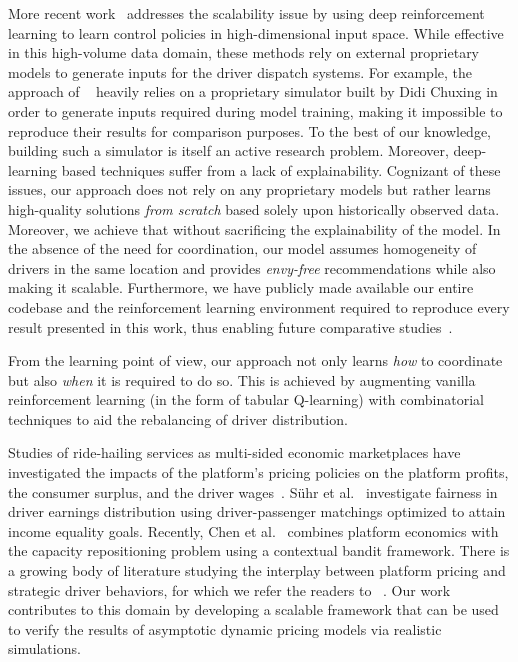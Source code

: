     
More recent work~\cite{Mnih2013-sj,Tang2019-xu,
    Lin2018-vs, Wen2017-vp, Wang2018-bv} 
    addresses the scalability issue by using deep reinforcement learning to learn 
    control policies in high-dimensional input space. 
While effective in this high-volume data domain, these methods rely on
    external proprietary models to generate inputs for the driver dispatch
    systems.
For example, the approach of ~\cite{Lin2018-vs} heavily relies on 
    a proprietary simulator built by Didi Chuxing in order to generate inputs 
    required during model training, making it impossible 
    to reproduce their results for comparison purposes.
To the best of our knowledge, building such a simulator is itself an 
   active research problem.
Moreover, deep-learning based techniques suffer from a lack of
    explainability.
Cognizant of these issues, our approach does not rely on any proprietary models 
    but rather learns high-quality solutions \emph{from scratch} based solely 
    upon historically observed data.
Moreover, we achieve that without sacrificing the explainability of the
    model.
In the absence of the need for coordination, our model assumes homogeneity of 
    drivers in the same location and provides
    \emph{envy-free} recommendations while also making it scalable. 
Furthermore, we have publicly made available our entire codebase and
    the reinforcement learning environment required to reproduce every result 
    presented in this work, thus 
    enabling future comparative studies~\cite{github-page}.

From the learning point of view, our approach not only learns \emph{how} to coordinate 
    but also \emph{when} it is required to do so. 
This is achieved by augmenting  vanilla reinforcement 
    learning (in the form of tabular Q-learning) with
    combinatorial techniques to aid the rebalancing of driver
    distribution.

Studies of ride-hailing services as multi-sided economic marketplaces have 
    investigated the impacts of the platform's pricing policies on the platform profits, 
    the consumer surplus, and the driver
    wages~\cite{Castillo2018-he, Bimpikis2016-yf, Besbes2019-ds, Ma2018-hb}.
S{\"u}hr et al.~\cite{Tom_Suhr-ps} investigate fairness in driver earnings 
    distribution using driver-passenger matchings optimized to attain 
    income equality goals.
Recently, Chen et al.~\cite{Chen2019-li} combines platform economics with the capacity
    repositioning problem using a contextual bandit framework. 
There is a growing body of literature studying the interplay between platform
    pricing and strategic driver behaviors, for which we refer the readers to
    ~\cite{Yan2018-wq}.
Our work contributes to this domain by 
    developing a scalable framework that can be used to verify the results of
    asymptotic dynamic pricing models via realistic simulations.

